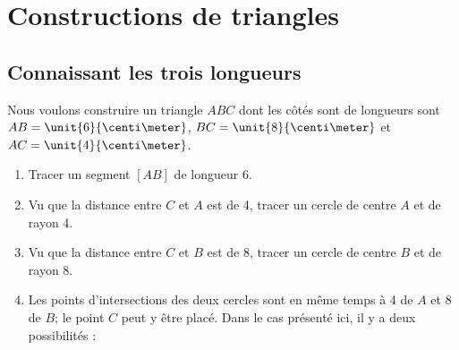


\section{Constructions de triangles}

\subsection{Connaissant les trois longueurs}

Nous voulons construire un triangle \(ABC\) dont les côtés sont de longueurs sont \( AB=\unit{6}{\centi\meter}\), \( BC=\unit{8}{\centi\meter}\) et \( AC=\unit{4}{\centi\meter}\).


\vspace{2cm}

\begin{enumerate}
    \item
        Tracer un segment \( [AB]\) de longueur \unit{6}{\centi\meter}.
\begin{center}
   
\end{center}
    \item
        Vu que la distance entre \( C\) et \( A\) est de \unit{4}{\centi\meter}, tracer un cercle de centre \( A\) et de rayon \unit{4}{\centi\meter}.
    \item
        Vu que la distance entre  \( C\) et \( B\) est de \unit{8}{\centi\meter}, tracer un cercle de centre \( B\) et de rayon \unit{8}{\centi\meter}.
\begin{center}
   
\end{center}
    \item
        Les points d'intersections des deux cercles sont en même temps à \unit{4}{\centi\meter} de \( A\) et \unit{8}{\centi\meter} de \( B\); le point \( C\) peut y être placé. Dans le cas présenté ici, il y a deux possibilités :

\begin{center}
   
\end{center}

\end{enumerate}

